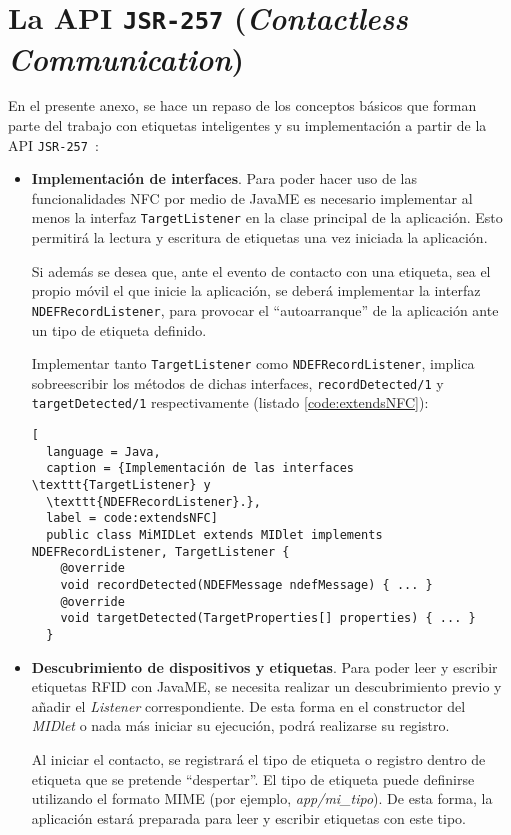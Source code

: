 \chapter{La \acs{API} \texttt{\acs{JSR}-257} (\emph{Contactless Communication})}
\label{chap:jsr257}

En el presente anexo, se hace un repaso de los conceptos básicos que
forman parte del trabajo con etiquetas inteligentes y su implementación a
partir de la \acs{API} \texttt{\acs{JSR}-257}~\cite{bib:jfontecha}:
\begin{itemize}
\item \textbf{Implementación de interfaces}. Para poder hacer uso de las 
funcionalidades \acs{NFC} por medio de \acs{JavaME}
es necesario implementar al menos la interfaz \texttt{TargetListener} en la
clase principal de la aplicación. Esto permitirá la lectura y escritura de
etiquetas una vez iniciada la aplicación.

Si además se desea que, ante el evento de contacto con una etiqueta, sea el 
propio móvil el que inicie la aplicación, se deberá implementar la interfaz
\texttt{NDEFRecordListener}, para provocar el ``autoarranque'' de la aplicación
ante un tipo de etiqueta definido.

Implementar tanto \texttt{TargetListener} como \texttt{NDEFRecordListener},
implica sobreescribir los métodos de dichas interfaces,
\texttt{recordDetected/1} y \texttt{targetDetected/1} respectivamente
(listado \ref{code:extendsNFC}):

\begin{lstlisting}[
  language = Java,
  caption = {Implementación de las interfaces \texttt{TargetListener} y
  \texttt{NDEFRecordListener}.},
  label = code:extendsNFC]
  public class MiMIDLet extends MIDlet implements NDEFRecordListener, TargetListener {
    @override
    void recordDetected(NDEFMessage ndefMessage) { ... }
    @override
    void targetDetected(TargetProperties[] properties) { ... }
  }
\end{lstlisting}

\item \textbf{Descubrimiento de dispositivos y etiquetas}. Para poder leer y 
escribir etiquetas \acs{RFID} con \acs{JavaME}, se necesita realizar un 
descubrimiento previo y añadir el \emph{Listener} correspondiente. De esta 
forma en el constructor del \emph{MIDlet} o nada más iniciar su ejecución, 
podrá realizarse su registro.

Al iniciar el contacto, se registrará el tipo de etiqueta o registro dentro de 
etiqueta que se pretende ``despertar''. El tipo de etiqueta puede
definirse utilizando el formato \acs{MIME} (por ejemplo, \emph{app/mi\_tipo}).
De esta forma, la aplicación estará preparada para leer y escribir etiquetas
con este tipo.


\end{itemize}

